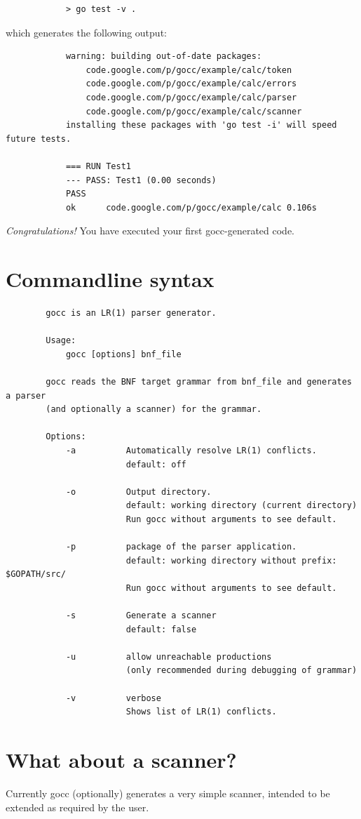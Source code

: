 \documentclass[12pt]{article}
\begin{document}
		\begin{verbatim}
			> go test -v .
		\end{verbatim}

		which generates the following output:

		\begin{verbatim}
			warning: building out-of-date packages:
			    code.google.com/p/gocc/example/calc/token
			    code.google.com/p/gocc/example/calc/errors
			    code.google.com/p/gocc/example/calc/parser
			    code.google.com/p/gocc/example/calc/scanner
			installing these packages with 'go test -i' will speed future tests.

			=== RUN Test1
			--- PASS: Test1 (0.00 seconds)
			PASS
			ok  	code.google.com/p/gocc/example/calc	0.106s		\end{verbatim}

		{\em Congratulations!} You have executed your first gocc-generated code.

\section{Commandline syntax}\label{sec:commandline}
	\begin{verbatim}
		gocc is an LR(1) parser generator.

		Usage:
		    gocc [options] bnf_file

		gocc reads the BNF target grammar from bnf_file and generates a parser 
		(and optionally a scanner) for the grammar.

		Options:
		    -a          Automatically resolve LR(1) conflicts.
		                default: off

		    -o          Output directory.
		                default: working directory (current directory)
		                Run gocc without arguments to see default.

		    -p          package of the parser application.
		                default: working directory without prefix: $GOPATH/src/
		                Run gocc without arguments to see default.

		    -s          Generate a scanner
		                default: false

		    -u          allow unreachable productions 
		                (only recommended during debugging of grammar)

		    -v          verbose
		                Shows list of LR(1) conflicts.
	\end{verbatim}

\section{What about a scanner?}\label{sec:scanner}
	Currently gocc (optionally) generates a very simple scanner, intended to be extended as required by the user.
\end{document}
